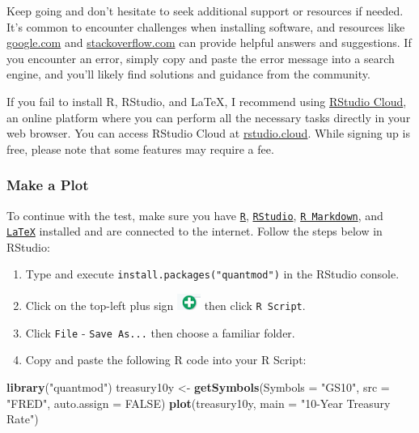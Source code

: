 \documentclass[
]{book}
\newenvironment{Shaded}{\begin{snugshade}}{\end{snugshade}}
\newcommand{\AttributeTok}[1]{\textcolor[rgb]{0.13,0.29,0.53}{#1}}
\newcommand{\ConstantTok}[1]{\textcolor[rgb]{0.56,0.35,0.01}{#1}}
\newcommand{\FunctionTok}[1]{\textcolor[rgb]{0.13,0.29,0.53}{\textbf{#1}}}
\newcommand{\NormalTok}[1]{#1}
\newcommand{\OtherTok}[1]{\textcolor[rgb]{0.56,0.35,0.01}{#1}}
\newcommand{\StringTok}[1]{\textcolor[rgb]{0.31,0.60,0.02}{#1}}
\providecommand{\tightlist}{%
  \setlength{\itemsep}{0pt}\setlength{\parskip}{0pt}}
\begin{document}
Keep going and don't hesitate to seek additional support or resources if needed. It's common to encounter challenges when installing software, and resources like \href{http://google.com}{google.com} and \href{http://stackoverflow.com/questions/tagged/r}{stackoverflow.com} can provide helpful answers and suggestions. If you encounter an error, simply copy and paste the error message into a search engine, and you'll likely find solutions and guidance from the community.

If you fail to install R, RStudio, and LaTeX, I recommend using \href{https://rstudio.cloud/}{RStudio Cloud}, an online platform where you can perform all the necessary tasks directly in your web browser. You can access RStudio Cloud at \href{https://rstudio.cloud/}{rstudio.cloud}. While signing up is free, please note that some features may require a fee.

\hypertarget{make-a-plot}{%
\subsubsection*{Make a Plot}\label{make-a-plot}}

To continue with the test, make sure you have \href{https://www.r-project.org/}{\texttt{R}}, \href{https://rstudio.com/}{\texttt{RStudio}}, \href{https://rmarkdown.rstudio.com/}{\texttt{R\ Markdown}}, and \href{https://www.latex-project.org/}{\texttt{LaTeX}} installed and are connected to the internet. Follow the steps below in RStudio:

\begin{enumerate}
\def\labelenumi{\arabic{enumi}.}
\tightlist
\item
  Type and execute \texttt{install.packages("quantmod")} in the RStudio console.
\item
  Click on the top-left plus sign \includegraphics{files/icons-rstudio/plus.png} then click \texttt{R\ Script}.
\item
  Click \texttt{File} - \texttt{Save\ As...} then choose a familiar folder.
\item
  Copy and paste the following R code into your R Script:
\end{enumerate}

\begin{Shaded}
\begin{Highlighting}[]
\FunctionTok{library}\NormalTok{(}\StringTok{"quantmod"}\NormalTok{)}
\NormalTok{treasury10y }\OtherTok{\textless{}{-}} \FunctionTok{getSymbols}\NormalTok{(}\AttributeTok{Symbols =} \StringTok{"GS10"}\NormalTok{, }\AttributeTok{src =} \StringTok{"FRED"}\NormalTok{, }\AttributeTok{auto.assign =} \ConstantTok{FALSE}\NormalTok{)}
\FunctionTok{plot}\NormalTok{(treasury10y, }\AttributeTok{main =} \StringTok{"10{-}Year Treasury Rate"}\NormalTok{)}
\end{Highlighting}
\end{Shaded}
\end{document}
